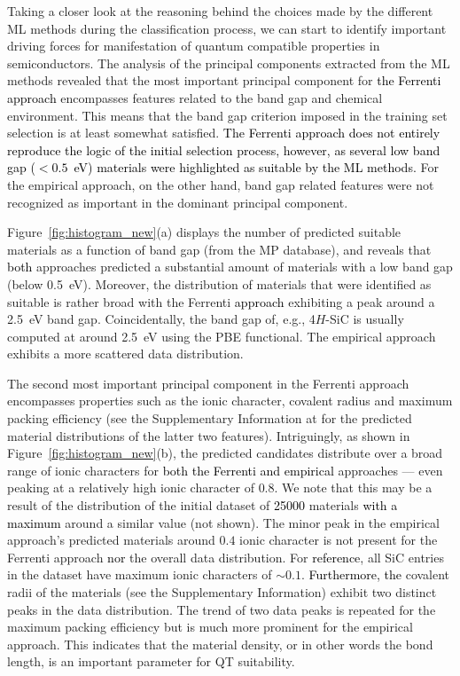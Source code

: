 \documentclass[superscriptaddress,unsortedaddress,
 amsmath,amssymb,
 aps,
]{revtex4-2}
\newcommand{\mrk}[1]{\textcolor{black}{#1}}
\begin{document}
Taking a closer look at the reasoning behind the choices made by the different ML methods during the classification process, we can start to identify important driving forces for manifestation of quantum compatible properties in semiconductors. 
The analysis of the principal components extracted from the ML methods revealed that the most important principal component for \mrk{the Ferrenti approach} encompasses features related to the band gap and chemical environment. This means that the band gap criterion imposed in the training set selection is at least somewhat satisfied. 
\mrk{The Ferrenti approach does not entirely reproduce the logic of the initial selection process, however, as several low band gap ($<0.5$~eV) materials were highlighted as suitable by the ML methods.}  
For the empirical approach, on the other hand, band gap related features were not recognized as important in the dominant principal component. 

Figure~\ref{fig:histogram_new}(a) displays the number of predicted suitable materials as a function of band gap (from the MP database), and reveals that \mrk{both} approaches predicted a substantial amount of materials with a low band gap (below \SI{0.5}{\electronvolt}). 
Moreover, the distribution of materials that were identified as suitable is rather broad with the Ferrenti \mrk{approach} exhibiting a peak around a \SI{2.5}{\electronvolt} band gap. 
Coincidentally, the band gap of, e.g., 4$H$-SiC is usually computed at around \SI{2.5}{\electronvolt} using the PBE functional. 
The empirical approach exhibits a more scattered data distribution. %

The second most important principal component in the Ferrenti approach encompasses properties such as the ionic character, covalent radius and maximum packing efficiency (see the Supplementary Information at \cite{supplementary} for the predicted material distributions of the latter two features).  
Intriguingly, as shown in  Figure~\ref{fig:histogram_new}(b), the predicted candidates distribute over a broad range of ionic characters for \mrk{both the Ferrenti and empirical} approaches --- even peaking at a relatively high ionic character of $0.8$. 
We note that this may be a result of the distribution of the initial dataset of \mrk{\num{25000}} materials \mrk{with a maximum} around a similar value (not shown). The minor peak in the empirical approach's predicted materials around $0.4$ ionic character is not present for the Ferrenti approach \mrk{nor} the overall data distribution. For \mrk{reference}, all SiC entries in the dataset have maximum ionic characters of $\sim 0.1$. 
\mrk{Furthermore, the} covalent radii of the materials (see the Supplementary Information) exhibit two distinct peaks in the data distribution. 
The trend of two data peaks is repeated for the maximum packing efficiency but is much more prominent for the empirical approach. This indicates that the material density, or in other words the bond length, is an important parameter for QT suitability.  
\end{document}
